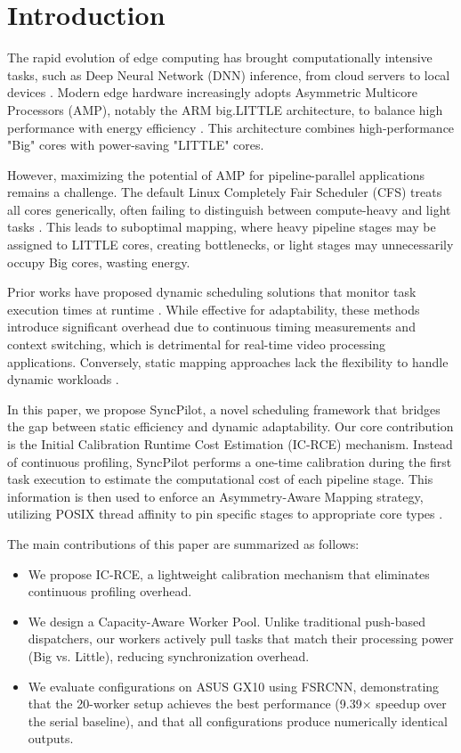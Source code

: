 \documentclass[runningheads]{llncs}
\begin{document}
\section{Introduction}
The rapid evolution of edge computing has brought computationally intensive tasks, such as Deep Neural Network (DNN) inference, from cloud servers to local devices \cite{shi2016edge, zhou2019edge}. Modern edge hardware increasingly adopts Asymmetric Multicore Processors (AMP), notably the ARM big.LITTLE architecture, to balance high performance with energy efficiency \cite{green2010biglittle, arm2011biglittle}. This architecture combines high-performance "Big" cores with power-saving "LITTLE" cores.

However, maximizing the potential of AMP for pipeline-parallel applications remains a challenge. The default Linux Completely Fair Scheduler (CFS) treats all cores generically, often failing to distinguish between compute-heavy and light tasks \cite{leo2013cfs, curiel2017cfsamp}. This leads to suboptimal mapping, where heavy pipeline stages may be assigned to LITTLE cores, creating bottlenecks, or light stages may unnecessarily occupy Big cores, wasting energy.

Prior works have proposed dynamic scheduling solutions that monitor task execution times at runtime \cite{cherng2014dynamicsched, jia2020runtimeoverhead}. While effective for adaptability, these methods introduce significant overhead due to continuous timing measurements and context switching, which is detrimental for real-time video processing applications. Conversely, static mapping approaches lack the flexibility to handle dynamic workloads \cite{wang2020pipeit}.

In this paper, we propose SyncPilot, a novel scheduling framework that bridges the gap between static efficiency and dynamic adaptability. Our core contribution is the Initial Calibration Runtime Cost Estimation (IC-RCE) mechanism. Instead of continuous profiling, SyncPilot performs a one-time calibration during the first task execution to estimate the computational cost of each pipeline stage. This information is then used to enforce an Asymmetry-Aware Mapping strategy, utilizing POSIX thread affinity to pin specific stages to appropriate core types \cite{solovyev2015pthreadaffinity}.

The main contributions of this paper are summarized as follows:
\begin{itemize}
\item We propose IC-RCE, a lightweight calibration mechanism that eliminates continuous profiling overhead.
\item We design a Capacity-Aware Worker Pool. Unlike traditional push-based dispatchers, our workers actively pull tasks that match their processing power (Big vs. Little), reducing synchronization overhead.
\item We evaluate configurations on ASUS GX10 using FSRCNN, demonstrating that the 20-worker setup achieves the best performance (9.39$\times$ speedup over the serial baseline), and that all configurations produce numerically identical outputs.
\end{itemize}
\end{document}
